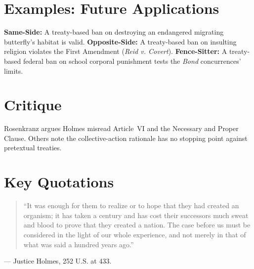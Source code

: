 \documentclass[12pt]{article}
\begin{document}
\section{Examples: Future Applications}
\textbf{Same-Side:} A treaty-based ban on destroying an endangered migrating butterfly's habitat is valid. \textbf{Opposite-Side:} A treaty-based ban on insulting religion violates the First Amendment (\textit{Reid v. Covert}). \textbf{Fence-Sitter:} A treaty-based federal ban on school corporal punishment tests the \textit{Bond} concurrences' limits.

\section{Critique}
Rosenkranz argues Holmes misread Article~VI and the Necessary and Proper Clause. Others note the collective-action rationale has no stopping point against pretextual treaties.

\section{Key Quotations}
\begin{quote}
``It was enough for them to realize or to hope that they had created an organism; it has taken a century and has cost their successors much sweat and blood to prove that they created a nation. The case before us must be considered in the light of our whole experience, and not merely in that of what was said a hundred years ago.''
\end{quote}
\noindent --- Justice Holmes, 252 U.S. at 433.
\end{document}
